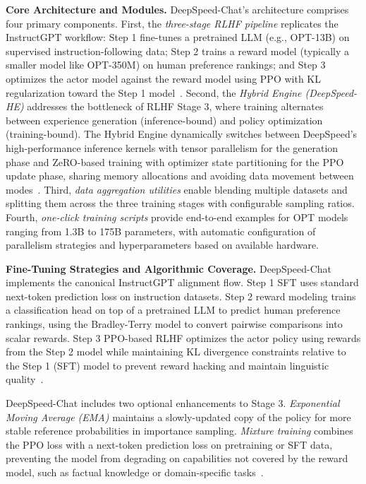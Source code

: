 \documentclass[conference]{IEEEtran}
\begin{document}
\textbf{Core Architecture and Modules.} DeepSpeed-Chat's architecture comprises four primary components. First, the \textit{three-stage RLHF pipeline} replicates the InstructGPT workflow: Step 1 fine-tunes a pretrained LLM (e.g., OPT-13B) on supervised instruction-following data; Step 2 trains a reward model (typically a smaller model like OPT-350M) on human preference rankings; and Step 3 optimizes the actor model against the reward model using PPO with KL regularization toward the Step 1 model~\cite{deepspeed-chat-paper}. Second, the \textit{Hybrid Engine (DeepSpeed-HE)} addresses the bottleneck of RLHF Stage 3, where training alternates between experience generation (inference-bound) and policy optimization (training-bound). The Hybrid Engine dynamically switches between DeepSpeed's high-performance inference kernels with tensor parallelism for the generation phase and ZeRO-based training with optimizer state partitioning for the PPO update phase, sharing memory allocations and avoiding data movement between modes~\cite{deepspeed-chat-github}. Third, \textit{data aggregation utilities} enable blending multiple datasets and splitting them across the three training stages with configurable sampling ratios. Fourth, \textit{one-click training scripts} provide end-to-end examples for OPT models ranging from 1.3B to 175B parameters, with automatic configuration of parallelism strategies and hyperparameters based on available hardware.

\textbf{Fine-Tuning Strategies and Algorithmic Coverage.} DeepSpeed-Chat implements the canonical InstructGPT alignment flow. Step 1 SFT uses standard next-token prediction loss on instruction datasets. Step 2 reward modeling trains a classification head on top of a pretrained LLM to predict human preference rankings, using the Bradley-Terry model to convert pairwise comparisons into scalar rewards. Step 3 PPO-based RLHF optimizes the actor policy using rewards from the Step 2 model while maintaining KL divergence constraints relative to the Step 1 (SFT) model to prevent reward hacking and maintain linguistic quality~\cite{deepspeed-chat-paper}.

DeepSpeed-Chat includes two optional enhancements to Stage 3. \textit{Exponential Moving Average (EMA)} maintains a slowly-updated copy of the policy for more stable reference probabilities in importance sampling. \textit{Mixture training} combines the PPO loss with a next-token prediction loss on pretraining or SFT data, preventing the model from degrading on capabilities not covered by the reward model, such as factual knowledge or domain-specific tasks~\cite{deepspeed-chat-github}.
\end{document}
